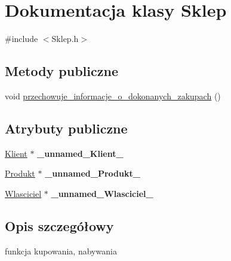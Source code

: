 \hypertarget{class_sklep}{\section{Dokumentacja klasy Sklep}
\label{class_sklep}
}


{\ttfamily \#include $<$Sklep.\+h$>$}

\subsection*{Metody publiczne}
\begin{DoxyCompactItemize}
\item 
void \hyperlink{class_sklep_a7c783df3f95f818f5fdd4390ee9ed7b4}{przechowuje\+\_\+informacje\+\_\+o\+\_\+dokonanych\+\_\+zakupach} ()
\end{DoxyCompactItemize}
\subsection*{Atrybuty publiczne}
\begin{DoxyCompactItemize}
\item 
\hypertarget{class_sklep_afef26be5b3b94091d290c2a991c3dd8d}{\hyperlink{class_klient}{Klient} $\ast$ {\bfseries \+\_\+unnamed\+\_\+\+Klient\+\_\+}}\label{class_sklep_afef26be5b3b94091d290c2a991c3dd8d}

\item 
\hypertarget{class_sklep_acdcaa2457c478fa65fb0447aa7556780}{\hyperlink{class_produkt}{Produkt} $\ast$ {\bfseries \+\_\+unnamed\+\_\+\+Produkt\+\_\+}}\label{class_sklep_acdcaa2457c478fa65fb0447aa7556780}

\item 
\hypertarget{class_sklep_ae1c8a273e881b3eafbe7c1857bb84320}{\hyperlink{class_wlasciciel}{Wlasciciel} $\ast$ {\bfseries \+\_\+unnamed\+\_\+\+Wlasciciel\+\_\+}}\label{class_sklep_ae1c8a273e881b3eafbe7c1857bb84320}

\end{DoxyCompactItemize}


\subsection{Opis szczegółowy}
funkcja kupowania, nabywania 

